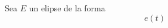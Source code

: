 \documentclass{article}
\title{}
\author{Andoni Latorre Galarraga}
\date{}
\begin{document}
\maketitle

Sea $E$ un elipse de la forma
$$
e(t)
$$
\end{document}
